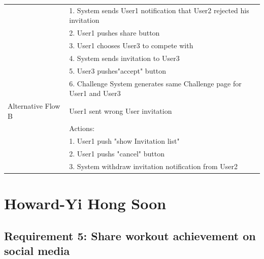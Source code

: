 \documentclass{article}
\begin{document}
\begin{table}[h!]
\begin{tabularx}{\textwidth}{|>{\raggedright\arraybackslash}p{}|X|}
                         & 1. System sends User1 notification that User2 rejected his invitation \\
                         & 2. User1 pushes share button \\
                         & 3. User1 chooses User3 to compete with\\
                         & 4. System sends invitation to User3 \\
                         & 5. User3 pushes"accept" button \\
                         & 6. Challenge System generates same Challenge page for User1 and User3 \\ \hline
        Alternative Flow B & User1 sent wrong User invitation \\
                         & Actions: \\
                         & 1. User1 push "show Invitation list" \\
                         & 2. User1 pushs "cancel" button \\
                         & 3. System withdraw invitation notification from User2\\ \hline
    \end{tabularx}
\end{table}

\newpage

\section{Howard-Yi Hong Soon}
		\subsection{Requirement 5: Share workout achievement on social media}
		
\end{document}
